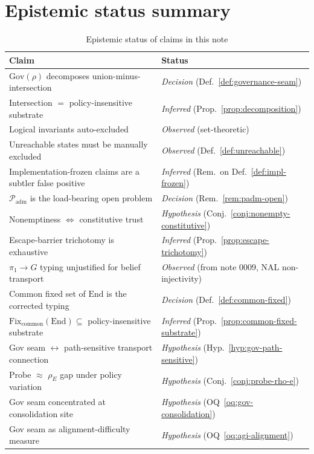 \documentclass[11pt]{article}
\newcommand{\Gov}{\mathrm{Gov}}
\newcommand{\Padm}{\mathcal{P}_{\mathrm{adm}}}
\newcommand{\End}{\mathrm{End}}
\newcommand{\Fixcommon}{\mathrm{Fix}_{\mathrm{common}}}
\begin{document}
\section{Epistemic status summary}

\begin{table}[h]
\centering
\begin{tabular}{|l|l|}
\hline
\textbf{Claim} & \textbf{Status} \\
\hline
$\Gov(\rho)$ decomposes union-minus-intersection & \emph{Decision} (Def.~\ref{def:governance-seam}) \\
Intersection $=$ policy-insensitive substrate & \emph{Inferred} (Prop.~\ref{prop:decomposition}) \\
Logical invariants auto-excluded & \emph{Observed} (set-theoretic) \\
Unreachable states must be manually excluded & \emph{Observed} (Def.~\ref{def:unreachable}) \\
Implementation-frozen claims are a subtler false positive & \emph{Inferred} (Rem.~on Def.~\ref{def:impl-frozen}) \\
$\Padm$ is the load-bearing open problem & \emph{Decision} (Rem.~\ref{rem:padm-open}) \\
Nonemptiness $\Leftrightarrow$ constitutive trust & \emph{Hypothesis} (Conj.~\ref{conj:nonempty-constitutive}) \\
Escape-barrier trichotomy is exhaustive & \emph{Inferred} (Prop.~\ref{prop:escape-trichotomy}) \\
$\pi_1 \to G$ typing unjustified for belief transport & \emph{Observed} (from note 0009, NAL non-injectivity) \\
Common fixed set of $\End$ is the corrected typing & \emph{Decision} (Def.~\ref{def:common-fixed}) \\
$\Fixcommon(\End) \subseteq$ policy-insensitive substrate & \emph{Inferred} (Prop.~\ref{prop:common-fixed-substrate}) \\
Gov seam $\leftrightarrow$ path-sensitive transport connection & \emph{Hypothesis} (Hyp.~\ref{hyp:gov-path-sensitive}) \\
Probe $\approx$ $\rho_E$ gap under policy variation & \emph{Hypothesis} (Conj.~\ref{conj:probe-rho-e}) \\
Gov seam concentrated at consolidation site & \emph{Hypothesis} (OQ~\ref{oq:gov-consolidation}) \\
Gov seam as alignment-difficulty measure & \emph{Hypothesis} (OQ~\ref{oq:agi-alignment}) \\
\hline
\end{tabular}
\caption{Epistemic status of claims in this note}
\label{tab:epistemic-status}
\end{table}
\end{document}
